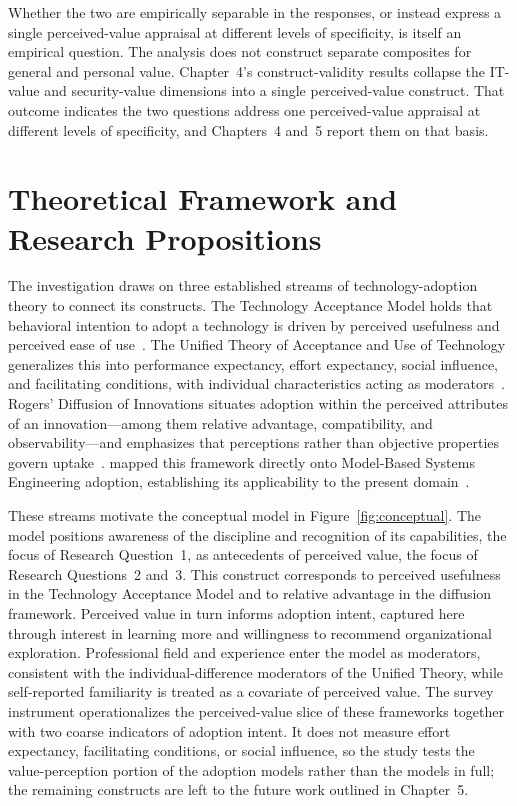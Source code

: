 Whether the two are empirically separable in the responses, or instead express a single perceived-value appraisal at different levels of specificity, is itself an empirical question. The analysis does not construct separate composites for general and personal value. Chapter~4's construct-validity results collapse the IT-value and security-value dimensions into a single perceived-value construct. That outcome indicates the two questions address one perceived-value appraisal at different levels of specificity, and Chapters~4 and~5 report them on that basis.

\section{Theoretical Framework and Research Propositions}

The investigation draws on three established streams of technology-adoption theory to connect its constructs. The Technology Acceptance Model holds that behavioral intention to adopt a technology is driven by perceived usefulness and perceived ease of use~\parencite{Davis_1989}. The Unified Theory of Acceptance and Use of Technology generalizes this into performance expectancy, effort expectancy, social influence, and facilitating conditions, with individual characteristics acting as moderators~\parencite{Venkatesh_2003}. Rogers' Diffusion of Innovations situates adoption within the perceived attributes of an innovation---among them relative advantage, compatibility, and observability---and emphasizes that perceptions rather than objective properties govern uptake~\parencite{Rogers_2003}. \citeauthor{Call_Herber_2022} mapped this framework directly onto Model-Based Systems Engineering adoption, establishing its applicability to the present domain~\parencite{Call_Herber_2022}.

These streams motivate the conceptual model in Figure~\ref{fig:conceptual}. The model positions awareness of the discipline and recognition of its capabilities, the focus of Research Question~1, as antecedents of perceived value, the focus of Research Questions~2 and~3. This construct corresponds to perceived usefulness in the Technology Acceptance Model and to relative advantage in the diffusion framework. Perceived value in turn informs adoption intent, captured here through interest in learning more and willingness to recommend organizational exploration. Professional field and experience enter the model as moderators, consistent with the individual-difference moderators of the Unified Theory, while self-reported familiarity is treated as a covariate of perceived value. The survey instrument operationalizes the perceived-value slice of these frameworks together with two coarse indicators of adoption intent. It does not measure effort expectancy, facilitating conditions, or social influence, so the study tests the value-perception portion of the adoption models rather than the models in full; the remaining constructs are left to the future work outlined in Chapter~5.


